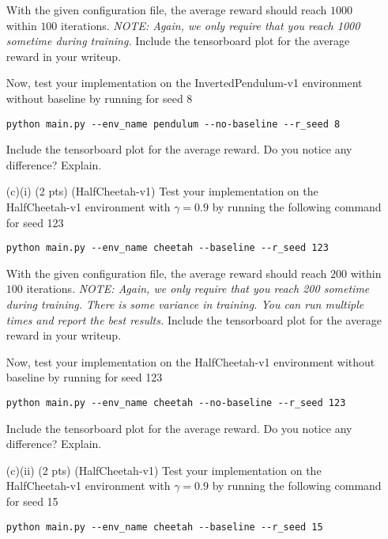 \documentclass{article}
\begin{document}
\begin{enumerate}
With the given configuration file, the average reward should reach $1000$ within $100$ iterations. \emph{NOTE: Again, we only require that you reach 1000 sometime during training.} Include the tensorboard plot for the average reward in your writeup.

Now, test your implementation on the InvertedPendulum-v1 environment without baseline by running for seed 8
\begin{tcolorbox}
\begin{verbatim}
python main.py --env_name pendulum --no-baseline --r_seed 8
\end{verbatim}
\end{tcolorbox}
Include the tensorboard plot for the average reward. Do you notice any difference? Explain.

\item[(c)(i) (2 pts)](HalfCheetah-v1)
Test your implementation on the HalfCheetah-v1 environment with $\gamma = 0.9$ by running the following command for seed 123
\begin{tcolorbox}
\begin{verbatim}
python main.py --env_name cheetah --baseline --r_seed 123
\end{verbatim}
\end{tcolorbox}

With the given configuration file, the average reward should reach $200$ within $100$ iterations. \emph{NOTE: Again, we only require that you reach 200 sometime during training. There is some variance in training. You can run multiple times and report the best results.} Include the tensorboard plot for the average reward in your writeup.

Now, test your implementation on the HalfCheetah-v1 environment without baseline by running for seed 123
\begin{tcolorbox}
\begin{verbatim}
python main.py --env_name cheetah --no-baseline --r_seed 123
\end{verbatim}
\end{tcolorbox}
Include the tensorboard plot for the average reward. Do you notice any difference? Explain.

\item[(c)(ii) (2 pts)](HalfCheetah-v1)
Test your implementation on the HalfCheetah-v1 environment with $\gamma = 0.9$ by running the following command for seed 15
\begin{tcolorbox}
\begin{verbatim}
python main.py --env_name cheetah --baseline --r_seed 15
\end{verbatim}
\end{tcolorbox}


\end{enumerate}
\end{document}

